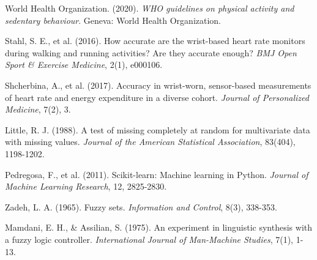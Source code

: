 \documentclass[12pt,letterpaper,twoside]{report}
\begin{document}
\begin{thebibliography}{99}

World Health Organization. (2020). \textit{WHO guidelines on physical activity and sedentary behaviour}. Geneva: World Health Organization.

Stahl, S. E., et al. (2016). How accurate are the wrist-based heart rate monitors during walking and running activities? Are they accurate enough? \textit{BMJ Open Sport \& Exercise Medicine}, 2(1), e000106.

Shcherbina, A., et al. (2017). Accuracy in wrist-worn, sensor-based measurements of heart rate and energy expenditure in a diverse cohort. \textit{Journal of Personalized Medicine}, 7(2), 3.

Little, R. J. (1988). A test of missing completely at random for multivariate data with missing values. \textit{Journal of the American Statistical Association}, 83(404), 1198-1202.

Pedregosa, F., et al. (2011). Scikit-learn: Machine learning in Python. \textit{Journal of Machine Learning Research}, 12, 2825-2830.

Zadeh, L. A. (1965). Fuzzy sets. \textit{Information and Control}, 8(3), 338-353.

Mamdani, E. H., \& Assilian, S. (1975). An experiment in linguistic synthesis with a fuzzy logic controller. \textit{International Journal of Man-Machine Studies}, 7(1), 1-13.

\end{thebibliography}
\end{document}
